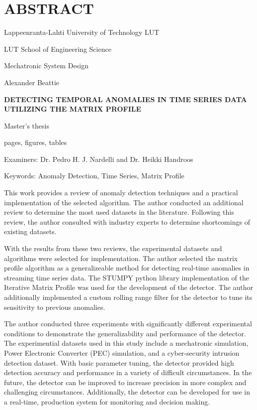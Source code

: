 \section*{\MakeUppercase{Abstract}}
{}%
\thispagestyle{empty}
\begin{singlespace} 
{
Lappeenranta-Lahti University of Technology LUT \bigskip

\parskip=0pt %

LUT School of Engineering Science \bigskip

Mechatronic System Design \bigskip

Alexander Beattie \bigskip \bigskip

\textbf{\MakeUppercase{Detecting Temporal Anomalies in Time Series Data}} \\
\textbf{\MakeUppercase{Utilizing the Matrix Profile}} \bigskip\bigskip

Master's thesis \bigskip

\the\year{} \bigskip

\pageref{LastPage} pages,  figures,  tables \bigskip

Examiners: Dr. Pedro H. J. Nardelli and Dr. Heikki Handroos \bigskip\bigskip

Keywords: Anomaly Detection, Time Series, Matrix Profile \bigskip
}

This work provides a review of anomaly detection techniques and a practical implementation of the selected algorithm. The author conducted an additional review to determine the most used datasets in the literature. Following this review, the author consulted with industry experts to determine shortcomings of existing datasets.

With the results from these two reviews, the experimental datasets and algorithms were selected for implementation. The author selected the matrix profile algorithm as a generalizeable method for detecting real-time anomalies in streaming time series data. The STUMPY python library implementation of the Iterative Matrix Profile was used for the development of the detector. The author additionally implemented a custom rolling range filter for the detector to tune its sensitivity to previous anomalies. 

The author conducted three experiments with significantly different experimental conditions to demonstrate the generalizability and performance of the detector. The experimential datasets used in this study include a mechatronic simulation, Power Electronic Converter (PEC) simulation, and a cyber-security intrusion detection dataset.  With basic parameter tuning, the detector provided high detection accuracy and performance in a variety of difficult circumstances. In the future, the detector can be improved to increase precision in more complex and challenging circumstances. Additionally, the detector can be developed for use in a real-time, production system for monitoring and decision making.
\end{singlespace}